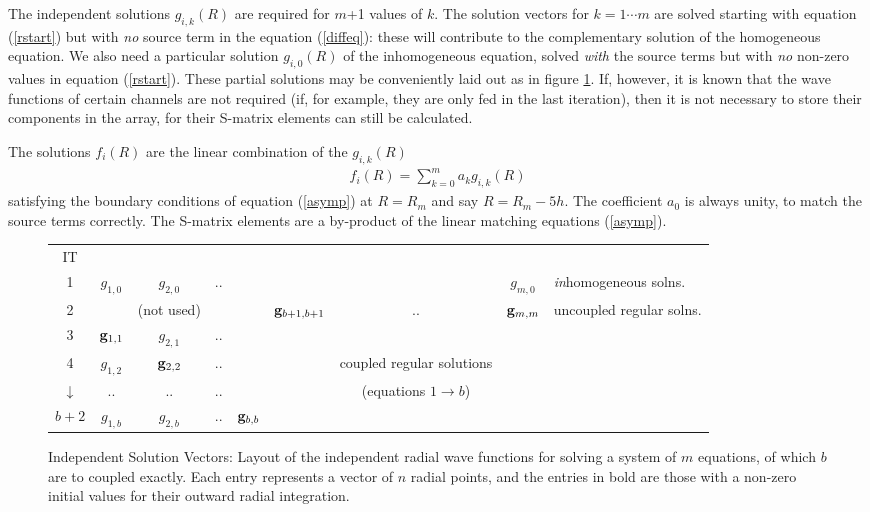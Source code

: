 \documentclass[11pt,a4paper]{article}
\begin{document}
The independent solutions $g_{i,k} (R) $ are required for $m$+1
values of $k$. The solution vectors for $k=1 \cdots m$ are solved
starting with equation (\ref{rstart}) but with {\em no} source term in
the equation (\ref{diffeq}): these will contribute to the complementary
solution of the homogeneous equation.
We also need a particular solution $g_{i,0} (R) $ of the
inhomogeneous equation, solved {\em with} the source terms but with
{\em no} non-zero values in equation (\ref{rstart}). These partial
solutions may be conveniently laid out as in figure \ref{CCsoln}.
If, however, it is known that the wave functions of certain channels are
not required (if, for example, they are only fed in the last iteration),
then it is not necessary to store their components in the array, for their
S-matrix elements can still be calculated.

The solutions $f_i (R) $ are the linear combination of the
$g_{i,k} (R) $
\begin{eqnarray} \label{linsum}
     f_i (R)  = \sum _{k=0} ^ m a_k g_{i,k} (R)
\end{eqnarray}
satisfying the boundary conditions of equation (\ref{asymp}) at
$R = R_m$ and say $R = R_m - 5h. $
The coefficient $ a_0 $ is always unity, to match the source terms
correctly.  The S-matrix elements are a by-product of the linear matching
equations (\ref{asymp}).

\begin{figure} \label{CCsoln}
\begin{tabular}{c|ccccccc|l}
\multicolumn{1}{c}{IT}&&&&&&&\multicolumn{1}{c}{}&\\
\cline{2-8}
1&$g_{1,0}$&$g_{2,0}$&..&  &   &   &$g_{m,0}$&{\em in}homogeneous solns.\\ \cline{2-8}
2&&(not used)&&\multicolumn{1}{c|}{}& ${\bf g}_{b+1,b+1}$&..&${\bf g}_{m,m}$ &uncoupled regular solns.\\ \cline{2-8}
3&${\bf g}_{1,1}$&$g_{2,1}$&..&\multicolumn{1}{c|}{}&\\ \cline{2-5}
4&$g_{1,2}$&${\bf g}_{2,2}$&..&\multicolumn{1}{c|}{}& & coupled regular solutions \\ \cline{2-5}
$\downarrow$&..&..&..&\multicolumn{1}{c|}{}& & (equations $1\rightarrow b$) \\ \cline{2-5}
$b+2$&$g_{1,b}$&$g_{2,b}$&..&\multicolumn{1}{c|}{${\bf g}_{b,b}$}\\ \cline{2-5}
\end{tabular}
\caption{ Independent Solution Vectors:
Layout of the independent radial wave functions for solving a system of
$m$ equations, of which $b$ are to coupled exactly. Each entry
represents a vector of $n$ radial points, and the entries in bold are
those with a non-zero initial values for their outward radial integration.}
\end{figure}
\end{document}
